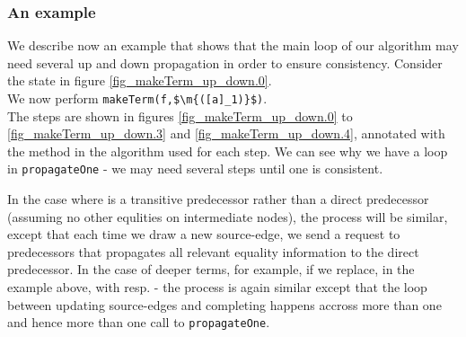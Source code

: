 \subsubsection*{An example}
We describe now an example that shows that the main loop of our algorithm may need several up and down propagation in order to ensure consistency. Consider the state in figure \ref{fig_makeTerm_up_down.0}.\\
We now perform \lstinline|makeTerm(f,$\m{([a]_1)}$)|.\\
The steps are shown in figures \ref{fig_makeTerm_up_down.0} to \ref{fig_makeTerm_up_down.3} and \ref{fig_makeTerm_up_down.4}, annotated with the method in the algorithm used for each step. We can see why we have a loop in \lstinline|propagateOne| - we may need several steps until one \GT{} is consistent.

In the case where  is a transitive predecessor rather than a direct predecessor (assuming no other equlities on intermediate nodes), the process will be similar, except that each time we draw a new source-edge, we send a request to predecessors that propagates all relevant equality information to the direct predecessor.
In the case of deeper terms, for example, if we replace, in the example above,  with 
 resp. - the process is again similar except that the loop between updating source-edges and completing \GFAs{} happens accross more than one \GT{} and hence more than one call to \lstinline|propagateOne|.


